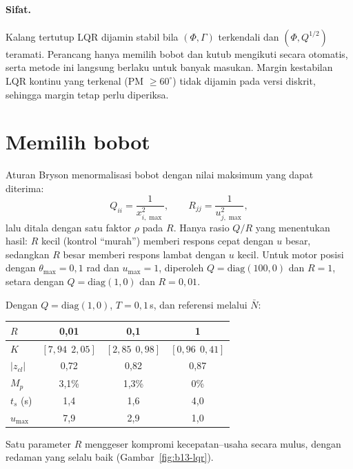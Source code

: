\paragraph{Sifat.} Kalang tertutup LQR dijamin stabil bila $(\Phi, \Gamma)$ terkendali dan $(\Phi, Q^{1/2})$ teramati. Perancang hanya memilih bobot dan kutub mengikuti secara otomatis, serta metode ini langsung berlaku untuk banyak masukan. Margin kestabilan LQR kontinu yang terkenal (PM $\ge 60^\circ$) tidak dijamin pada versi diskrit, sehingga margin tetap perlu diperiksa.

\section{Memilih bobot}
Aturan Bryson menormalisasi bobot dengan nilai maksimum yang dapat diterima:
\begin{equation}
	Q_{ii} = \frac{1}{x_{i,\max}^2},\qquad R_{jj} = \frac{1}{u_{j,\max}^2},
\end{equation}
lalu ditala dengan satu faktor $\rho$ pada $R$. Hanya rasio $Q/R$ yang menentukan hasil: $R$ kecil (kontrol ``murah'') memberi respons cepat dengan $u$ besar, sedangkan $R$ besar memberi respons lambat dengan $u$ kecil. Untuk motor posisi dengan $\theta_{\max} = 0{,}1$ rad dan $u_{\max} = 1$, diperoleh $Q = \text{diag}(100, 0)$ dan $R = 1$, setara dengan $Q = \text{diag}(1, 0)$ dan $R = 0{,}01$.

\begin{contoh}
	Dengan $Q = \text{diag}(1, 0)$, $T = 0{,}1$\,s, dan referensi melalui $\bar N$:
	\begin{center}
		\renewcommand{\arraystretch}{1.2}
		\begin{tabular}{@{}l c c c@{}}
			\toprule
			$R$ & 0,01 & 0,1 & 1 \\
			\midrule
			$K$ & $[7{,}94\ \ 2{,}05]$ & $[2{,}85\ \ 0{,}98]$ & $[0{,}96\ \ 0{,}41]$ \\
			$|z_{cl}|$ & 0,72 & 0,82 & 0,87 \\
			$M_p$ & 3,1\% & 1,3\% & 0\% \\
			$t_s$ (s) & 1,4 & 1,6 & 4,0 \\
			$u_{\max}$ & 7,9 & 2,9 & 1,0 \\
			\bottomrule
		\end{tabular}
	\end{center}
	Satu parameter $R$ menggeser kompromi kecepatan--usaha secara mulus, dengan redaman yang selalu baik (Gambar~\ref{fig:b13-lqr}).
\end{contoh}

